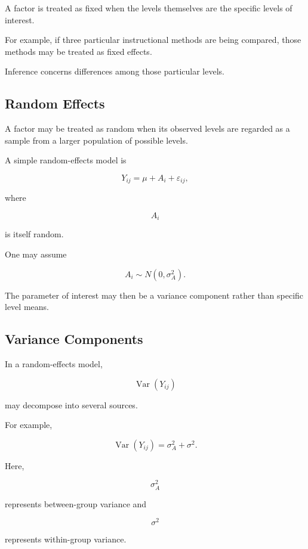 A factor is treated as fixed when the levels themselves are the specific
levels of interest.

For example, if three particular instructional methods are being
compared, those methods may be treated as fixed effects.

Inference concerns differences among those particular levels.

\subsection{Random Effects}
\label{subsec:anova-random-effects}

A factor may be treated as random when its observed levels are regarded
as a sample from a larger population of possible levels.

A simple random-effects model is

\[
\boxed{
Y_{ij}
=
\mu
+
A_i
+
\varepsilon_{ij},
}
\]

where

\[
A_i
\]

is itself random.

One may assume

\[
\boxed{
A_i
\sim
N(0,\sigma_A^2).
}
\]

The parameter of interest may then be a variance component rather than
specific level means.

\subsection{Variance Components}
\label{subsec:variance-components}

In a random-effects model,

\[
\operatorname{Var}(Y_{ij})
\]

may decompose into several sources.

For example,

\[
\boxed{
\operatorname{Var}(Y_{ij})
=
\sigma_A^2
+
\sigma^2.
}
\]

Here,

\[
\sigma_A^2
\]

represents between-group variance and

\[
\sigma^2
\]

represents within-group variance.

